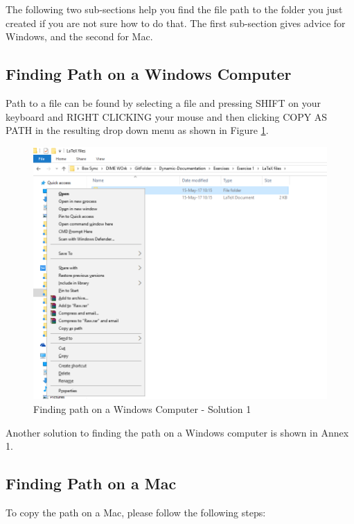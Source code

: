 \documentclass[]{article}
\begin{document}
The following two sub-sections help you find the file path to the folder you just created if you are not sure how to do that. The first sub-section gives advice for Windows, and the second for Mac.

\subsection*{Finding Path on a Windows Computer}

Path to a file can be found by selecting a file and pressing {\color{red}SHIFT on your keyboard and RIGHT CLICKING your mouse and then clicking COPY AS PATH in the resulting drop down menu} as shown in Figure \ref{fig:pathwin3}.

\begin{figure}[H]
	\centering
	\includegraphics[width=0.9\linewidth]{img/pathwin3}
	\caption{Finding path on a Windows Computer - Solution 1}
	\label{fig:pathwin3}
\end{figure}


Another solution to finding the path on a Windows computer is shown in Annex 1.
	
\subsection*{Finding Path on a Mac}

To copy the path on a Mac, please follow the following steps: 
\end{document}
